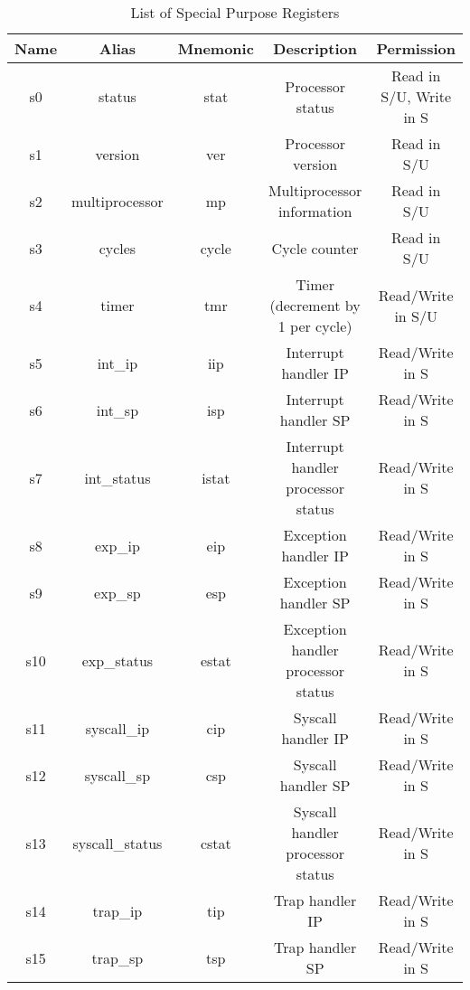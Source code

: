 \documentclass{article}
\begin{document}
    \begin{table}[H]
    \centering
    \caption{List of Special Purpose Registers}
    \label{table:spr}
    \begin{tabular}{|c|c|c|c|c|}
    \hline Name &   Alias           &   Mnemonic        &   Description                 &   Permission \\
    \hline s0   &   status      &   stat            &   Processor status            &   Read in S/U, Write in S \\
    \hline s1   &   version     &   ver         &   Processor version           &   Read in S/U \\
    \hline s2   &   multiprocessor  &   mp          &   Multiprocessor information  &   Read in S/U \\
    \hline s3   &   cycles      &   cycle       &   Cycle counter       &   Read in S/U \\
    \hline s4   &   timer           &   tmr         &   Timer (decrement by 1 per cycle)        &   Read/Write in S/U \\
    \hline s5   &   int\_ip         &   iip         &   Interrupt handler IP        &   Read/Write in S \\
    \hline s6   &   int\_sp         &   isp         &   Interrupt handler SP        &   Read/Write in S \\
    \hline s7   &   int\_status     &   istat       &   Interrupt handler processor status  &   Read/Write in S \\
    \hline s8   &   exp\_ip         &   eip         &   Exception handler IP        &   Read/Write in S \\
    \hline s9   &   exp\_sp         &   esp         &   Exception handler SP        &   Read/Write in S \\
    \hline s10  &   exp\_status     &   estat       &   Exception handler processor status  &   Read/Write in S \\  
    \hline s11  &   syscall\_ip     &   cip         &   Syscall handler IP      &   Read/Write in S \\
    \hline s12  &   syscall\_sp     &   csp         &   Syscall handler SP      &   Read/Write in S \\
    \hline s13  &   syscall\_status &   cstat       &   Syscall handler processor status    &   Read/Write in S \\      
    \hline s14  &   trap\_ip        &   tip         &   Trap handler IP     &   Read/Write in S \\
    \hline s15  &   trap\_sp        &   tsp         &   Trap handler SP     &   Read/Write in S \\

\end{tabular}
\end{table}
\end{document}
